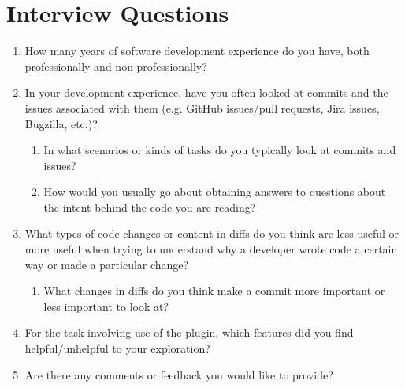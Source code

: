 \section{Interview Questions}
\label{sec:Interview-Questions}

\begin{enumerate}
    \item How many years of software development experience do you have, both professionally and non-professionally?
    \item In your development experience, have you often looked at commits and the issues associated with them (e.g. GitHub issues/pull requests, Jira issues, Bugzilla, etc.)?
        \begin{enumerate}
            \item In what scenarios or kinds of tasks do you typically look at commits and issues?
            \item How would you usually go about obtaining answers to questions about the intent behind the code you are reading?
        \end{enumerate}
    \item What types of code changes or content in diffs do you think are less useful or more useful when trying to understand why a developer wrote code a certain way or made a particular change? 
        \begin{enumerate}
            \item What changes in diffs do you think make a commit more important or less important to look at?
        \end{enumerate}
    \item For the task involving use of the plugin, which features did you find helpful/unhelpful to your exploration?
    \item Are there any comments or feedback you would like to provide?
\end{enumerate}

\endinput

This would be any supporting material not central to the dissertation.
For example:
\begin{itemize}
\item additional details of methodology and/or data;
\item diagrams of specialized equipment developed.;
\item copies of questionnaires and survey instruments.
\end{itemize}